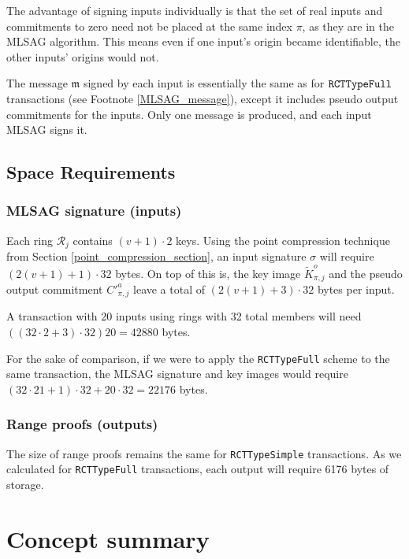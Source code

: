 The advantage of signing inputs individually is that the set of real inputs and commitments to zero need not be placed at the same index $\pi$, as they are in the MLSAG algorithm. This means even if one input's origin became identifiable, the other inputs' origins would not.

The message $\mathfrak{m}$ signed by each input is essentially the same as for $\tt RCTTypeFull$ transactions (see Footnote \ref{MLSAG_message}), except it includes pseudo output commitments for the inputs. Only one message is produced, and each input MLSAG signs it.


\subsection{Space Requirements}

\subsubsection*{MLSAG signature (inputs)}

Each ring \(\mathcal{R}_j\) contains \((v+1) \cdot 2\) keys. Using the point compression technique from Section \ref{point_compression_section}, an input signature $\sigma$ will require \( (2(v+1) + 1) \cdot 32  \) bytes. On top of this is, the key image $\tilde{K}^o_{\pi,j}$ and the pseudo output commitment $C'^a_{\pi,j}$ leave a total of $(2(v+1)+3) \cdot 32$ bytes per input.

A transaction with 20 inputs using rings with 32 total members will need \(((32 \cdot 2 + 3) \cdot 32) 20 = 42880 \) bytes.

For the sake of comparison, if we were to apply the {\tt RCTTypeFull} scheme to the same transaction, the MLSAG signature and key images would require \(( 32 \cdot 21 + 1) \cdot 32 + 20 \cdot 32 = 22176\) bytes.


\subsubsection*{Range proofs (outputs)}

The size of range proofs remains the same for {\tt RCTTypeSimple} transactions. As we calculated for {\tt RCTTypeFull} transactions, each output will require 6176 bytes of storage.



\newpage
\section{Concept summary}
\label{sec:transaction_summary}

